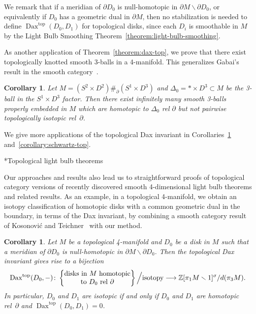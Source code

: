 \documentclass[11pt]{amsart}
\makeatletter
\def\subsubsection{\@startsection{subsubsection}{3}%
  \z@{.7\linespacing\@plus.2\linespacing}{-1.5ex}%
  {\normalfont\bfseries}}
\def\to{\mathchoice{\longrightarrow}{\rightarrow}{\rightarrow}{\rightarrow}}
\newtheorem{corollaryalpha}[theoremalpha]{Corollary}\def\thecorollaryalpha{\Alph{corollaryalpha}}
\theoremstyle{definition}
\theoremstyle{theorem-giventitle}
\theoremstyle{definition-giventitle}
\numberwithin{equation}{section}
\def\Z{\mathbb{Z}}
\def\top{\mathrm{top}}
\def\Dax{\operatorname{Dax}}
\def\setminus{\smallsetminus}
\makeatother
\begin{document}
We remark that if a meridian of $\partial D_0$ is null-homotopic in $\partial M\setminus \partial D_0$, or equivalently if $D_0$ has a geometric dual in $\partial M$, then no stabilization is needed to define $\Dax^\top(D_0,D_1)$ for topological disks, since each $D_i$ is smoothable in $M$ by the Light Bulb Smoothing Theorem~\ref{theorem:light-bulb-smoothing}\@.

As another application of Theorem~\ref{theorem:dax-top}, we prove that there exist topologically knotted smooth 3-balls in a 4-manifold.
This generalizes Gabai's result in the smooth category~\cite[Theorems~0.8 and~5.1]{Gabai:2021-1}.

\begin{corollaryalpha}
  \label{corollary:knotted-3-disk}
  Let $M = (S^2\times D^2) \mathbin{\mathord{\#}_\partial} (S^1\times D^3)$ and $\Delta_0 = *\times D^3\subset M$ be the 3-ball in the $S^1\times D^3$ factor.
  Then there exist infinitely many smooth 3-balls properly embedded in $M$ which are homotopic to $\Delta_0$ rel $\partial$ but not pairwise topologically isotopic rel~$\partial$.
\end{corollaryalpha}

We give more applications of the topological Dax invariant in Corollaries~\ref{corollary:disk-top-isotopy-classification} and~\ref{corollary:schwartz-top}.


\subsubsection*{Topological light bulb theorems}

Our approaches and results also lead us to straightforward proofs of topological category versions of recently discovered smooth 4-dimensional light bulb theorems and related results.
As an example, in a topological 4-manifold, we obtain an isotopy classification of homotopic disks with a common geometric dual in the boundary, in terms of the Dax invariant, by combining a smooth category result of Kosonovi\'c and Teichner~\cite{Kosanovic-Teichner:2024-2} with our method.

\begin{corollaryalpha}
  \label{corollary:disk-top-isotopy-classification}
  Let $M$ be a topological 4-manifold and $D_0$ be a disk in $M$ such that a meridian of $\partial D_0$ is null-homotopic in $\partial M \setminus \partial D_0$.
  Then the topological Dax invariant gives rise to a bijection
  \[
    \Dax^\top(D_0,-)\colon
    \left\{\begin{tabular}{@{}c@{}}
      disks in $M$ homotopic\\
      to $D_0$ rel~$\partial$
    \end{tabular}\right\}
    \Big/
    \text{isotopy}
    \to
    \Z[\pi_1M\setminus 1]^\sigma / d(\pi_3M).
  \]
  In particular, $D_0$ and $D_1$ are isotopic if and only if $D_0$ and $D_1$ are homotopic rel~$\partial$ and $\Dax^\top(D_0, D_1)=0$.
\end{corollaryalpha}
\end{document}
